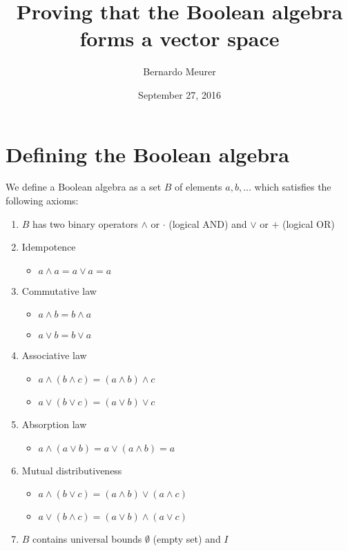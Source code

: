 \documentclass{article}
\title{Proving that the Boolean algebra forms a vector space}
\date{September 27, 2016}
\author{Bernardo Meurer}
\begin{document}
\maketitle
\newpage
\section{Defining the Boolean algebra}
\label{sec:Defining the Boolean algebra}

We define a Boolean algebra as a set $B$ of elements $a,b,\dots$ which satisfies
the following axioms\cite{booleanalgebra}:

\begin{enumerate}
	\item $B$ has two binary operators $\wedge$ or $\cdot$ (logical AND) and
	      $\vee$ or $+$ (logical OR)
	\item Idempotence
	      \begin{itemize}
	      	\item $a\wedge a = a \vee a = a$
	      \end{itemize}
	\item Commutative law
	      \begin{itemize}
	      	\item $a \wedge b = b \wedge a$
	      	\item $a \vee b = b \vee a$
	      \end{itemize}
	\item Associative law
	      \begin{itemize}
	      	\item $a \wedge (b \wedge c) = (a \wedge b) \wedge c$
	      	\item $a \vee (b \vee c) = (a \vee b) \vee c$
	      \end{itemize}
	\item Absorption law
	      \begin{itemize}
	      	\item $a \wedge (a \vee b) = a \vee (a \wedge b) = a$
	      \end{itemize}
	\item Mutual distributiveness
	      \begin{itemize}
	      	\item $a \wedge (b \vee c) = (a \wedge b) \vee (a \wedge c)$
	      	\item $a \vee (b \wedge c) = (a \vee b) \wedge (a \vee c)$
	      \end{itemize}
	\item $B$ contains universal bounds $\emptyset$ (empty set) and $I$

\end{enumerate}
\end{document}
